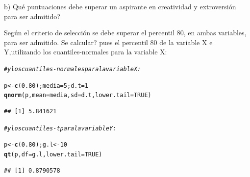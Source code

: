 \documentclass[12pt,letterpaper]{article}\usepackage[]{graphicx}\usepackage[]{color}
\makeatletter
\newcommand{\hlnum}[1]{\textcolor[rgb]{0.686,0.059,0.569}{#1}}%
\newcommand{\hlcom}[1]{\textcolor[rgb]{0.678,0.584,0.686}{\textit{#1}}}%
\newcommand{\hlstd}[1]{\textcolor[rgb]{0.345,0.345,0.345}{#1}}%
\newcommand{\hlkwb}[1]{\textcolor[rgb]{0.69,0.353,0.396}{#1}}%
\newcommand{\hlkwc}[1]{\textcolor[rgb]{0.333,0.667,0.333}{#1}}%
\newcommand{\hlkwd}[1]{\textcolor[rgb]{0.737,0.353,0.396}{\textbf{#1}}}%
\newenvironment{kframe}{%
 \def\at@end@of@kframe{}%
 \ifinner\ifhmode%
  \def\at@end@of@kframe{\end{minipage}}%
  \begin{minipage}{\columnwidth}%
 \fi\fi%
 \def\FrameCommand##1{\hskip\@totalleftmargin \hskip-\fboxsep
 \colorbox{shadecolor}{##1}\hskip-\fboxsep
     \hskip-\linewidth \hskip-\@totalleftmargin \hskip\columnwidth}%
 \MakeFramed {\advance\hsize-\width
   \@totalleftmargin\z@ \linewidth\hsize
   \@setminipage}}%
 {\par\unskip\endMakeFramed%
 \at@end@of@kframe}
\newenvironment{knitrout}{}{} %
\makeatother
\begin{document}
\begin{description}
  \item b) Qu\'e puntuaciones debe superar un aspirante en creatividad y extroversi\'on para ser admitido?
  
Seg\'un el criterio de selecci\'on se debe superar el percentil 80, en ambas variables, para ser admitido. Se calcular? pues el percentil 80 de la variable X e Y,utilizando los cuantiles-normales para la variable X: 
\begin{knitrout}
\color{fgcolor}\begin{kframe}
\begin{alltt}
\hlcom{# y los cuantiles-normales para la variable X:}

\hlstd{p} \hlkwb{<-} \hlkwd{c}\hlstd{(}\hlnum{0.80}\hlstd{); media}\hlkwb{=}\hlnum{5}\hlstd{; d.t}\hlkwb{=}\hlnum{1}
\hlkwd{qnorm}\hlstd{(p,} \hlkwc{mean}\hlstd{=media,} \hlkwc{sd}\hlstd{=d.t,} \hlkwc{lower.tail}\hlstd{=}\hlnum{TRUE}\hlstd{)}
\end{alltt}
\begin{verbatim}
## [1] 5.841621
\end{verbatim}
\end{kframe}
\end{knitrout}

\begin{knitrout}
\color{fgcolor}\begin{kframe}
\begin{alltt}
\hlcom{#y los cuantiles-t para la variable Y:}

\hlstd{p} \hlkwb{<-} \hlkwd{c}\hlstd{(}\hlnum{0.80}\hlstd{); g.l} \hlkwb{<-} \hlnum{10}
\hlkwd{qt}\hlstd{(p,} \hlkwc{df}\hlstd{=g.l,} \hlkwc{lower.tail}\hlstd{=}\hlnum{TRUE}\hlstd{)}
\end{alltt}
\begin{verbatim}
## [1] 0.8790578
\end{verbatim}
\end{kframe}
\end{knitrout}
\end{description}
\end{document}
